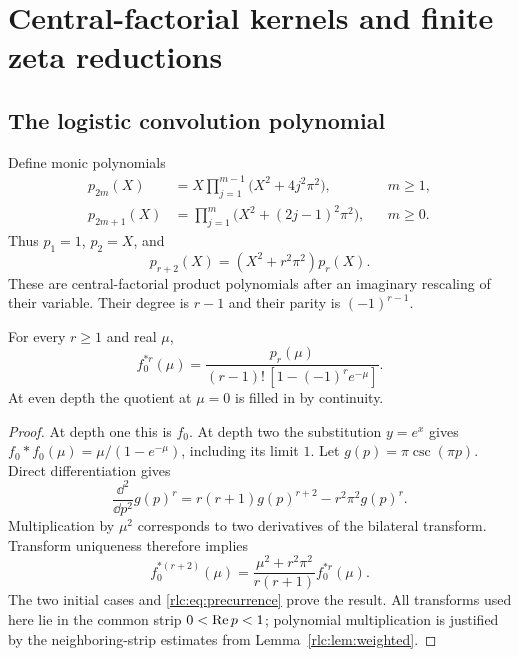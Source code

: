 \section{Central-factorial kernels and finite zeta reductions}
\label{rlc:sec:central}

\subsection{The logistic convolution polynomial}
Define monic polynomials
\begin{align}
 p_{2m}(X)&=X\prod_{j=1}^{m-1}\bigl(X^2+4j^2\pi^2\bigr),
          &&m\ge1,\label{rlc:eq:peven}\\
 p_{2m+1}(X)&=\prod_{j=1}^{m}\bigl(X^2+(2j-1)^2\pi^2\bigr),
          &&m\ge0.\label{rlc:eq:podd}
\end{align}
Thus $p_1=1$, $p_2=X$, and
\begin{equation}\label{rlc:eq:precurrence}
 p_{r+2}(X)=(X^2+r^2\pi^2)p_r(X).
\end{equation}
These are central-factorial product polynomials after an imaginary
rescaling of their variable. Their degree is $r-1$ and their parity
is $(-1)^{r-1}$.

\begin{lemma}\label{rlc:lem:logistic}
For every $r\ge1$ and real $\mu$,
\begin{equation}\label{rlc:eq:logistic}
 f_0^{*r}(\mu)=
 \frac{p_r(\mu)}{(r-1)!\,[1-(-1)^r e^{-\mu}]}.
\end{equation}
At even depth the quotient at $\mu=0$ is filled in by continuity.
\end{lemma}
\begin{proof}
At depth one this is $f_0$. At depth two the substitution $y=e^x$
gives $f_0*f_0(\mu)=\mu/(1-e^{-\mu})$, including its limit $1$.
Let $g(p)=\pi\csc(\pi p)$. Direct differentiation gives
\[
 \frac{\dd^2}{\dd p^2}g(p)^r
  =r(r+1)g(p)^{r+2}-r^2\pi^2g(p)^r.
\]
Multiplication by $\mu^2$ corresponds to two derivatives of the
bilateral transform. Transform uniqueness therefore implies
\[
 f_0^{*(r+2)}(\mu)=
 \frac{\mu^2+r^2\pi^2}{r(r+1)}f_0^{*r}(\mu).
\]
The two initial cases and \eqref{rlc:eq:precurrence} prove the result.
All transforms used here lie in the common strip $0<\operatorname{Re} p<1$;
polynomial multiplication is justified by the neighboring-strip
estimates from Lemma~\ref{rlc:lem:weighted}.
\end{proof}

